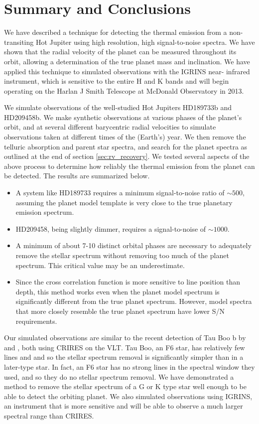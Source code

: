 \documentclass[11pt]{report}     %
\begin{document}
\section{Summary and Conclusions}
\label{sec:summary}
We have described a technique for detecting the thermal emission from a 
non-transiting Hot Jupiter using high resolution, high signal-to-noise spectra.
We have shown that the radial velocity of the planet can be measured throughout
its orbit, allowing a determination of the true planet mass and inclination. We
have applied this technique to simulated observations with the IGRINS near-
infrared instrument, which is sensitive to the entire H and K bands and will
begin operating on the Harlan J Smith Telescope at McDonald Observatory in 
2013.

We simulate observations of the well-studied Hot Jupiters HD189733b and HD209458b. We make synthetic observations at various phases of the planet's orbit, and at several different barycentric radial velocities to simulate observations taken at different times of the (Earth's) year. We then remove the telluric absorption and parent star spectra, and search for the planet spectra as outlined at the end of section \ref{sec:rv_recovery}. We tested several aspects of the above process to determine how reliably the thermal emission from the planet can be detected. The results are summarized below.
\begin{itemize}
\item A system like HD189733 requires a minimum signal-to-noise ratio of $\sim 500$, assuming the planet model template is very close to the true planetary emission spectrum.
\item HD209458, being slightly dimmer, requires a signal-to-noise of $\sim 1000$.
\item A minimum of about 7-10 distinct orbital phases are necessary to adequately remove the stellar spectrum without removing too much of the planet spectrum. This critical value may be an underestimate.
\item Since the cross correlation function is more sensitive to line position than depth, this method works even when the planet model spectrum is significantly different from the true planet spectrum. However, model spectra that more closely resemble the true planet spectrum have lower S/N requirements.
\end{itemize}

Our simulated observations are similar to the recent detection of Tau Boo b by \cite{Rodler2012} and \cite{Brogi2012}, both using CRIRES on the VLT. Tau Boo, an F6 star, has relatively few lines and and so the stellar spectrum removal is significantly simpler than in a later-type star. In fact, an F6 star has no strong lines in the spectral window they used, and so they do no stellar spectrum removal. We have demonstrated a method to remove the stellar spectrum of a G or K type star well enough to be able to detect the orbiting planet. We also simulated observations using IGRINS, an instrument that is more sensitive and will be able to observe a much larger spectral range than CRIRES. 
\end{document}
